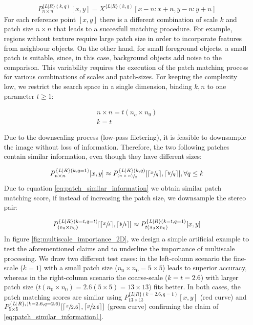 \documentclass[runningheads]{llncs}
\begin{document}
\begin{gather}
    P^{ \{L|R\} (k,q)}_{n \times n}[x,y] = X^{ \{ L|R \}(k,q)} [x-n:x+n, y-n:y+n]
\end{gather}
%
For each reference point $[x,y]$ there is a different combination of scale $k$ and patch size $n \times n$ that leads to a succesfull matching procedure. For example, regions without texture require large patch size in order to incorporate features from neighbour objects. On the other hand, for small foreground objects, a small patch is suitable, since, in this case, background objects add noise to the comparison. This variability requires the execution of the patch matching process for various combinations of scales and patch-sizes. For keeping the complexity low, we restrict the search space in a single dimension, binding $k, n$ to one parameter $t\geq1$:

\begin{gather}
    n \times n = t(n_o \times n_0) \label{eq:t_param1}\\
    k = t \label{eq:t_param2}
\end{gather}

Due to the downscaling process (low-pass filetering), it is feasible to downsample the image without loss of information. Therefore, the two following patches contain similar information, even though they have different sizes:

\begin{gather} \label{eq:patch_similar_information}
    P^{ \{L|R\} (k,q=1)}_{n \times n}[x,y] \approx P^{ \{L|R\} (k,q)}_{\sfrac{(n \times n)}{q}}[\lceil \sfrac{x}{q} \rceil,\lceil \sfrac{y}{q} \rceil], \forall q \leq k
\end{gather}{}
%
Due to equation \ref{eq:patch_similar_information} we obtain similar patch matching score, if instead of increasing the patch size, we downsample the stereo pair:

\begin{gather} \label{eq:patch_similar_information1}
     P^{ \{L|R\} (k = t, q = t)}_{(n_0 \times n_0)}[\lceil \sfrac{x}{t} \rceil, \lceil \sfrac{y}{t} \rceil] \approx P^{ \{L|R\} (k = t, q = 1)}_{t(n_0 \times n_0)}[x,y] 
\end{gather}{}
%
In figure \ref{fig:multiscale_importance_2D}, we design a simple artificial example to test the aforementioned claims and to underline the importance of multiscale processing. We draw two different test cases: in the left-column scenario the fine-scale ($k=1$) with a small patch size ($n_0 \times n_0 = 5 \times 5$) leads to superior accuracy, whereas in the right-column scenario the coarse-scale ($k=t=2.6$) with larger patch size ($t(n_0 \times n_0) = 2.6(5 \times 5) =13 \times 13$) fits better. In both cases, the patch matching scores are similar using $ P^{ \{L|R\} (k = 2.6, q = 1)}_{13 \times 13}[x,y] $ (red curve) and $P^{ \{L|R\}, (k = 2.6, q = 2.6)}_{5 \times 5}[\lceil \sfrac{x}{2.6} \rceil, \lceil \sfrac{y}{2.6} \rceil ]$ (green curve) confirming the claim of \ref{eq:patch_similar_information1}.
\end{document}
